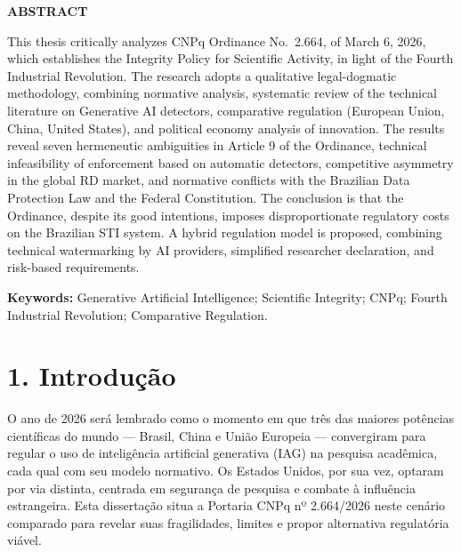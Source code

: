 \documentclass[
  12pt,
  a4paper,
  brazil,
  twoside
]{report}
\begin{document}
\newpage
\begin{center}
  \vspace*{2cm}
  {\Large\bfseries ABSTRACT\par}
  \vspace{1cm}
  \begin{minipage}{14cm}
  \onehalfspacing
  This thesis critically analyzes CNPq Ordinance No.~2.664, of March 6,
  2026, which establishes the Integrity Policy for Scientific Activity,
  in light of the Fourth Industrial Revolution. The research adopts a
  qualitative legal-dogmatic methodology, combining normative analysis,
  systematic review of the technical literature on Generative AI
  detectors, comparative regulation (European Union, China, United
  States), and political economy analysis of innovation. The results
  reveal seven hermeneutic ambiguities in Article 9 of the Ordinance,
  technical infeasibility of enforcement based on automatic detectors,
  competitive asymmetry in the global RD market, and normative conflicts
  with the Brazilian Data Protection Law and the Federal Constitution.
  The conclusion is that the Ordinance, despite its good intentions,
  imposes disproportionate regulatory costs on the Brazilian STI system.
  A hybrid regulation model is proposed, combining technical
  watermarking by AI providers, simplified researcher declaration, and
  risk-based requirements.
  \end{minipage}
  \vspace{1cm}
  \par\noindent
  \begin{minipage}{14cm}
  \textbf{Keywords:} Generative Artificial Intelligence; Scientific
Integrity; CNPq; Fourth Industrial Revolution; Comparative Regulation.
  \end{minipage}
\end{center}

\newpage
\tableofcontents
\newpage


\section{1. Introdução}\label{introduuxe7uxe3o}

O ano de 2026 será lembrado como o momento em que três das maiores
potências científicas do mundo --- Brasil, China e União Europeia ---
convergiram para regular o uso de inteligência artificial generativa
(IAG) na pesquisa acadêmica, cada qual com seu modelo normativo. Os
Estados Unidos, por sua vez, optaram por via distinta, centrada em
segurança de pesquisa e combate à influência estrangeira. Esta
dissertação situa a Portaria CNPq nº 2.664/2026 neste cenário comparado
para revelar suas fragilidades, limites e propor alternativa regulatória
viável.
\end{document}
